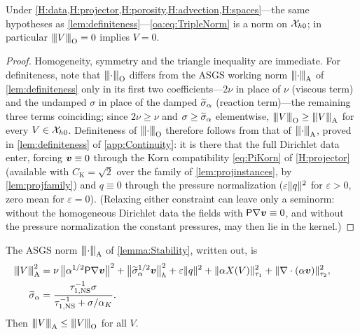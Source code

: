 \begin{lemma}[Definiteness]
\label{oa:lem:definiteness}
Under \cref{H:data,H:projector,H:porosity,H:advection,H:spaces}---the same hypotheses as \cref{lem:definiteness}---\cref{oa:eq:TripleNorm} is a
norm on $\mathcal{X}_{h0}$; in particular ${\lvert\kern-0.25ex\lvert\kern-0.25ex\lvert V \rvert\kern-0.25ex\rvert\kern-0.25ex\rvert}_{\mathrm{O}} = 0$ implies $V = 0$.
\end{lemma}

\begin{proof}
Homogeneity, symmetry and the triangle inequality are immediate. For definiteness, note that
${\lvert\kern-0.25ex\lvert\kern-0.25ex\lvert \cdot \rvert\kern-0.25ex\rvert\kern-0.25ex\rvert}_{\mathrm{O}}$ differs from the ASGS working norm ${\lvert\kern-0.25ex\lvert\kern-0.25ex\lvert \cdot \rvert\kern-0.25ex\rvert\kern-0.25ex\rvert}_{\mathrm{A}}$ of
\cref{lem:definiteness} only in its first two coefficients---$2\nu$ in place of $\nu$ (viscous term) and
the undamped $\sigma$ in place of the damped $\widetilde{\sigma}_{\alpha}$ (reaction term)---the remaining three terms
coinciding; since $2\nu \ge \nu$ and $\sigma \ge \widetilde{\sigma}_{\alpha}$ elementwise, ${\lvert\kern-0.25ex\lvert\kern-0.25ex\lvert V \rvert\kern-0.25ex\rvert\kern-0.25ex\rvert}_{\mathrm{O}} \ge
{\lvert\kern-0.25ex\lvert\kern-0.25ex\lvert V \rvert\kern-0.25ex\rvert\kern-0.25ex\rvert}_{\mathrm{A}}$ for every $V \in \mathcal{X}_{h0}$. Definiteness of ${\lvert\kern-0.25ex\lvert\kern-0.25ex\lvert \cdot \rvert\kern-0.25ex\rvert\kern-0.25ex\rvert}_{\mathrm{O}}$ therefore
follows from that of ${\lvert\kern-0.25ex\lvert\kern-0.25ex\lvert \cdot \rvert\kern-0.25ex\rvert\kern-0.25ex\rvert}_{\mathrm{A}}$, proved in \cref{lem:definiteness} of \cref{app:Continuity}:
it is there that the full Dirichlet data enter, forcing $\boldsymbol{v} \equiv 0$ through the Korn
compatibility \cref{eq:PiKorn} of \cref{H:projector} (available with $C_{\mathrm{K}} = \sqrt2$
over the family of \cref{lem:projinstances}, by \cref{lem:projfamily}) and $q \equiv 0$
through the pressure normalization
($\varepsilon\lVert q \rVert^2$ for $\varepsilon > 0$, zero mean for $\varepsilon = 0$). (Relaxing either constraint can leave only a seminorm: without the homogeneous
Dirichlet data the fields with $\mathsf{P}\nabla\boldsymbol{v}\equiv0$, and without the pressure normalization
the constant pressures, may then lie in the kernel.)
\end{proof}

\begin{lemma}
\label{oa:lem:normcomparison}
The ASGS norm ${\lvert\kern-0.25ex\lvert\kern-0.25ex\lvert \cdot \rvert\kern-0.25ex\rvert\kern-0.25ex\rvert}_{\mathrm{A}}$ of \cref{lemma:Stability}, written out, is
\[
\begin{aligned}
  {\lvert\kern-0.25ex\lvert\kern-0.25ex\lvert V \rvert\kern-0.25ex\rvert\kern-0.25ex\rvert}_{\mathrm{A}}^2
  &= \nu\,\bigl\lVert \alpha^{1/2}\mathsf{P}\nabla\boldsymbol{v} \bigr\rVert^2
  + \bigl\lVert \widetilde{\sigma}_\alpha^{1/2}\boldsymbol{v} \bigr\rVert_h^2
  + \varepsilon\lVert q \rVert^2
  + \lVert \alpha X(V) \rVert_{\tau_1}^2
  + \lVert \nabla\cdot(\alpha\boldsymbol{v}) \rVert_{\tau_2}^2,
  \qquad \\
  \widetilde{\sigma}_\alpha
  &= \frac{\tau_{1,\mathrm{NS}}^{-1}\sigma}{\tau_{1,\mathrm{NS}}^{-1} + \sigma/\alpha_K}.
\end{aligned}
\]
Then ${\lvert\kern-0.25ex\lvert\kern-0.25ex\lvert V \rvert\kern-0.25ex\rvert\kern-0.25ex\rvert}_{\mathrm{A}} \le {\lvert\kern-0.25ex\lvert\kern-0.25ex\lvert V \rvert\kern-0.25ex\rvert\kern-0.25ex\rvert}_{\mathrm{O}}$ for all $V$.
\end{lemma}

